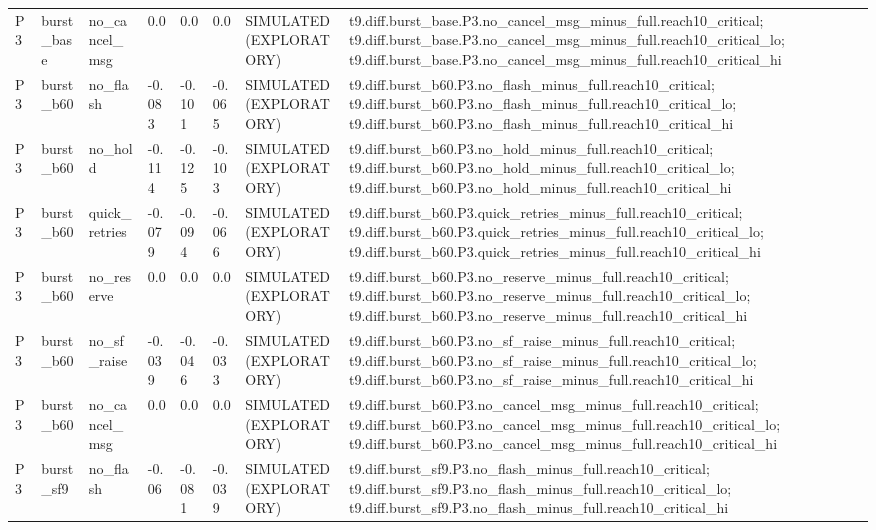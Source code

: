 \begin{table}[t]
\begin{tabular}{llllllll}
P3 & burst\_base & no\_cancel\_msg & 0.0 & 0.0 & 0.0 & SIMULATED (EXPLORATORY) & t9.diff.burst\_base.P3.no\_cancel\_msg\_minus\_full.reach10\_critical; t9.diff.burst\_base.P3.no\_cancel\_msg\_minus\_full.reach10\_critical\_lo; t9.diff.burst\_base.P3.no\_cancel\_msg\_minus\_full.reach10\_critical\_hi \\
P3 & burst\_b60 & no\_flash & -0.083 & -0.101 & -0.065 & SIMULATED (EXPLORATORY) & t9.diff.burst\_b60.P3.no\_flash\_minus\_full.reach10\_critical; t9.diff.burst\_b60.P3.no\_flash\_minus\_full.reach10\_critical\_lo; t9.diff.burst\_b60.P3.no\_flash\_minus\_full.reach10\_critical\_hi \\
P3 & burst\_b60 & no\_hold & -0.114 & -0.125 & -0.103 & SIMULATED (EXPLORATORY) & t9.diff.burst\_b60.P3.no\_hold\_minus\_full.reach10\_critical; t9.diff.burst\_b60.P3.no\_hold\_minus\_full.reach10\_critical\_lo; t9.diff.burst\_b60.P3.no\_hold\_minus\_full.reach10\_critical\_hi \\
P3 & burst\_b60 & quick\_retries & -0.079 & -0.094 & -0.066 & SIMULATED (EXPLORATORY) & t9.diff.burst\_b60.P3.quick\_retries\_minus\_full.reach10\_critical; t9.diff.burst\_b60.P3.quick\_retries\_minus\_full.reach10\_critical\_lo; t9.diff.burst\_b60.P3.quick\_retries\_minus\_full.reach10\_critical\_hi \\
P3 & burst\_b60 & no\_reserve & 0.0 & 0.0 & 0.0 & SIMULATED (EXPLORATORY) & t9.diff.burst\_b60.P3.no\_reserve\_minus\_full.reach10\_critical; t9.diff.burst\_b60.P3.no\_reserve\_minus\_full.reach10\_critical\_lo; t9.diff.burst\_b60.P3.no\_reserve\_minus\_full.reach10\_critical\_hi \\
P3 & burst\_b60 & no\_sf\_raise & -0.039 & -0.046 & -0.033 & SIMULATED (EXPLORATORY) & t9.diff.burst\_b60.P3.no\_sf\_raise\_minus\_full.reach10\_critical; t9.diff.burst\_b60.P3.no\_sf\_raise\_minus\_full.reach10\_critical\_lo; t9.diff.burst\_b60.P3.no\_sf\_raise\_minus\_full.reach10\_critical\_hi \\
P3 & burst\_b60 & no\_cancel\_msg & 0.0 & 0.0 & 0.0 & SIMULATED (EXPLORATORY) & t9.diff.burst\_b60.P3.no\_cancel\_msg\_minus\_full.reach10\_critical; t9.diff.burst\_b60.P3.no\_cancel\_msg\_minus\_full.reach10\_critical\_lo; t9.diff.burst\_b60.P3.no\_cancel\_msg\_minus\_full.reach10\_critical\_hi \\
P3 & burst\_sf9 & no\_flash & -0.06 & -0.081 & -0.039 & SIMULATED (EXPLORATORY) & t9.diff.burst\_sf9.P3.no\_flash\_minus\_full.reach10\_critical; t9.diff.burst\_sf9.P3.no\_flash\_minus\_full.reach10\_critical\_lo; t9.diff.burst\_sf9.P3.no\_flash\_minus\_full.reach10\_critical\_hi \\

\end{tabular}
\end{table}
